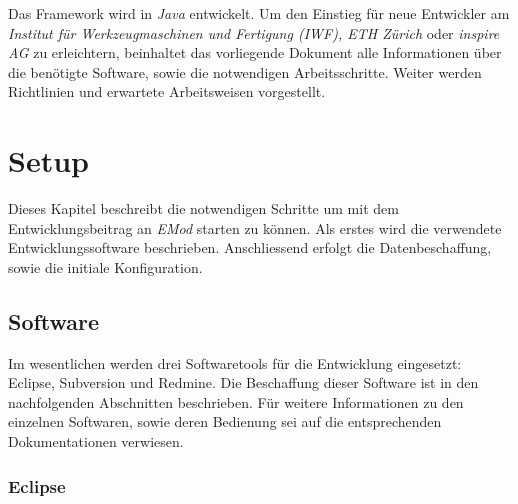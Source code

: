 \documentclass[a4paper,11pt,pdftex,twoside]{scrartcl}
\newcommand{\ethz}{\emph{ETH Zürich}\xspace}
\newcommand{\iwf}{\emph{Institut für Werkzeugmaschinen und Fertigung (IWF), \ethz}\xspace}
\newcommand{\inspire}{\emph{inspire AG}\xspace}
\begin{document}
Das Framework wird in \emph{Java} entwickelt.
Um den Einstieg für neue Entwickler am \iwf oder \inspire zu erleichtern, beinhaltet das vorliegende Dokument alle Informationen über die benötigte Software, sowie die notwendigen Arbeitsschritte.
Weiter werden Richtlinien und erwartete Arbeitsweisen vorgestellt.

\section{Setup}
Dieses Kapitel beschreibt die notwendigen Schritte um mit dem Entwicklungsbeitrag an \emph{EMod} starten zu können.
Als erstes wird die verwendete Entwicklungssoftware beschrieben.
Anschliessend erfolgt die Datenbeschaffung, sowie die initiale Konfiguration.

\subsection{Software}
Im wesentlichen werden drei Softwaretools für die Entwicklung eingesetzt: 
Eclipse, Subversion und Redmine.
Die Beschaffung dieser Software ist in den nachfolgenden Abschnitten beschrieben.
Für weitere Informationen zu den einzelnen Softwaren, sowie deren Bedienung sei auf die entsprechenden Dokumentationen verwiesen.

\subsubsection{Eclipse}
\end{document}
